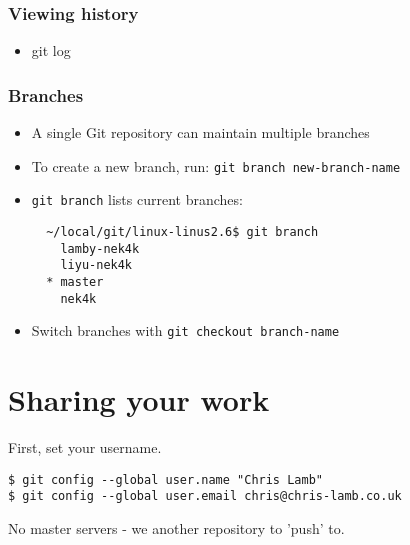 \documentclass{beamer}
\begin{document}
\begin{frame}[fragile]
    \frametitle{Viewing history}

    \begin{itemize}
        \item \alert{git log}
    \end{itemize}
\end{frame}



\begin{frame}[fragile]
    \frametitle{Branches}

    \begin{itemize}
        \item A single Git repository can maintain multiple branches
        \item To create a new branch, run: \verb#git branch new-branch-name#
        \item \verb#git branch# lists current branches:

    \begin{verbatim}
  ~/local/git/linux-linus2.6$ git branch
    lamby-nek4k
    liyu-nek4k
  * master
    nek4k\end{verbatim}
        \item Switch branches with \verb#git checkout branch-name#
    \end{itemize}

\end{frame}




\section{Sharing your work}

\begin{frame}[fragile]
    First, set your username.

    \begin{verbatim}
$ git config --global user.name "Chris Lamb"
$ git config --global user.email chris@chris-lamb.co.uk
    \end{verbatim}
\end{frame}

\begin{frame}[fragile]
    No master servers - we another repository to 'push' to.


\end{frame}
\end{document}
